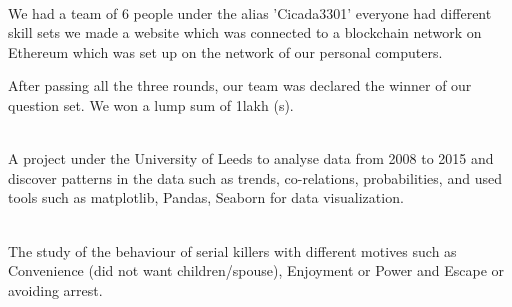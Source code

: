 \documentclass{article}
\begin{document}
\begin{minipage}[t]{0.66\textwidth}

 \\
\vspace{\topsep} %
\begin{tightemize}
\item We had a team of 6 people under the alias 'Cicada3301' everyone had different skill sets we made a website which was connected to a blockchain network on Ethereum which was set up on the network of our personal computers. 
\item  After passing all the three rounds, our team was declared the winner of our question set. We won a lump sum of 1lakh (s).  
\end{tightemize}
\sectionsep


 \\
 A project under the University of Leeds to analyse data from 2008 to 2015 and discover patterns in the data such as trends, co-relations, probabilities, and used tools such as matplotlib, Pandas, Seaborn for data visualization.
\sectionsep

 \\
The study of the behaviour of serial killers with different motives such as Convenience (did not want children/spouse), Enjoyment or Power and Escape or avoiding arrest.
\end{minipage}
\end{document}
